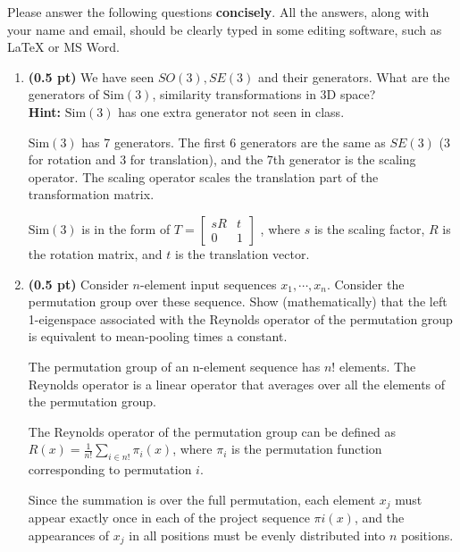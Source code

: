 %
%
Please answer the following questions \textbf{concisely}.
%
All the answers, along with your name and email, should be clearly typed in
some editing software, such as \LaTeX{} or MS Word.

%
\begin{enumerate}

\item {\bf (0.5 pt)} We have seen $SO(3),SE(3)$ and their generators. What are the generators of $\text{Sim}(3)$, similarity transformations in 3D space?\\
{\bf Hint:} $\text{Sim}(3)$ has one extra generator not seen in class.

$\text{Sim}(3)$ has 7 generators. The first 6 generators are the same as $SE(3)$
(3 for rotation and 3 for translation), and the 7th generator is the scaling
operator. The scaling operator scales the translation part of the transformation
matrix.

$\text{Sim}(3)$ is in the form of $T = \begin{bmatrix}sR & t\\ 0 & 1\end{bmatrix}$
, where $s$ is the scaling factor, $R$ is the rotation matrix, and
$t$ is the translation vector.

\vspace{.3in}

\item {\bf (0.5 pt)} Consider $n$-element input sequences $x_{1}, \cdots,
x_{n}$.
%
Consider the permutation group over these sequence.
%
Show (mathematically) that the left 1-eigenspace associated with the Reynolds operator of the
permutation group is equivalent to mean-pooling times a constant.

The permutation group of an n-element sequence has $n!$ elements. The Reynolds
operator is a linear operator that averages over all the elements of the
permutation group.

The Reynolds operator of the permutation group can be defined as $R(x) =
\frac{1}{n!} \sum_{i \in n!} \pi_{i}(x)$, where $\pi_i$ is the permutation
function corresponding to permutation $i$.

Since the summation is over the full permutation, each element $x_j$ must appear
exactly once in each of the project sequence $\pi{i}(x)$, and the appearances of $x_j$ in all positions must be evenly distributed into $n$ positions. 


\end{enumerate}
